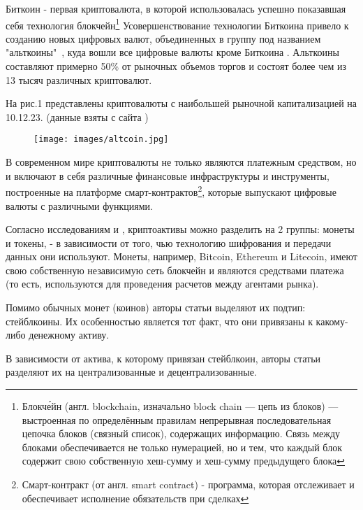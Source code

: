 \documentclass[14pt, a4paper]{extarticle}
\begin{document}
Биткоин - первая криптовалюта, в которой использовалась успешно показавшая себя технология блокчейн\footnote{Блокче́йн (англ. blockchain, изначально block chain — цепь из блоков) — выстроенная по определённым правилам непрерывная последовательная цепочка блоков (связный список), содержащих информацию. Связь между блоками обеспечивается не только нумерацией, но и тем, что каждый блок содержит свою собственную хеш-сумму и хеш-сумму предыдущего блока}
Усовершенствование технологии Биткоина привело к созданию новых цифровых валют, объединенных в группу под названием "альткоины"\ , куда вошли все цифровые валюты кроме Биткоина \cite{ciaian2018virtual}. Альткоины составляют примерно 50\% от рыночных объемов торгов и состоят более чем из 13 тысяч различных криптовалют.

На рис.1 представлены криптовалюты с наибольшей рыночной капитализацией на 10.12.23.
(данные взяты с сайта \cite{coinmarketcup})

\begin{figure}[!tbp]
  \centering
  \hfill
{\texttt{[image: images/altcoin.jpg]}\label{fig:f2}}
  \caption{}
\end{figure}


В современном мире криптовалюты не только являются платежным средством, но и включают в себя различные финансовые инфраструктуры и инструменты, построенные на платформе смарт-контрактов\footnote{Смарт-контракт (от англ. smart contract) - программа, которая отслеживает и обеспечивает исполнение обязательств при сделках}, которые выпускают цифровые валюты с различными функциями. 

Согласно исследованиям \cite{mukhopadhyay2018ethereum} и \cite{victor2019measuring}, криптоактивы можно разделить на 2 группы: монеты и токены, - в зависимости от того, чью технологию шифрования и передачи данных они используют. Монеты, например, Bitcoin, Ethereum и Litecoin, имеют свою собственную независимую сеть блокчейн и являются средствами платежа (то есть, используются для проведения расчетов между агентами рынка). 

Помимо обычных монет (коинов) авторы статьи \cite{ante2021influence} выделяют их подтип: стейблкоины. 
Их особенностью является тот факт, что они привязаны к какому-либо денежному активу.

В зависимости от актива, к которому привязан стейблкоин, авторы статьи \cite{qin2021cefi} разделяют их на централизованные и децентрализованные.
\end{document}
